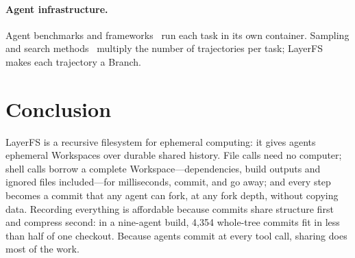 \documentclass[letterpaper,twocolumn,10pt]{article}
\newcommand{\sys}{LayerFS}
\newcommand{\ws}{Workspace}
\begin{document}
\paragraph{Agent infrastructure.} Agent benchmarks and
frameworks~\cite{swebench,sweagent,openhands} run each task in its own
container. Sampling and search methods~\cite{monkeys,tot} multiply the number
of trajectories per task; \sys{} makes each trajectory a Branch.

\section{Conclusion}

\sys{} is a recursive filesystem for ephemeral computing: it gives agents
ephemeral \ws{}s over durable shared history. File calls
need no computer; shell calls borrow a complete \ws{}---dependencies, build
outputs and ignored files included---for milliseconds, commit, and go away;
and every step becomes a commit that any agent can fork, at any fork depth,
without copying data. Recording everything is affordable because commits
share structure first and compress second: in a nine-agent build, 4,354
whole-tree commits fit in less than half of one checkout. Because agents
commit at every tool call, sharing does most of the work.

\balance

\end{document}
